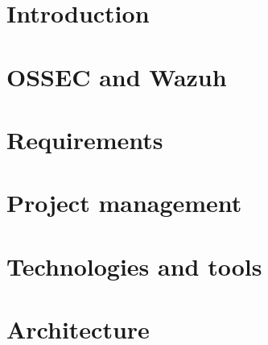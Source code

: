 \documentclass[12pt,twoside,a4paper]{book}
\begin{document}


\cleardoublepage



\cleardoublepage
\pagestyle{plain}
\tableofcontents
\listoffigures
\listoftables



\cleardoublepage
{}
\setcounter{page}{1}
\pagestyle{headings}
\chapter{Introduction}


\cleardoublepage
\chapter{OSSEC and Wazuh}


\cleardoublepage
\chapter{Requirements}


\cleardoublepage
\chapter{Project management}



%



\cleardoublepage
\chapter{Technologies and tools}


\chapter{Architecture}

\end{document}
